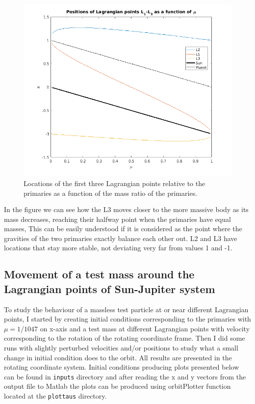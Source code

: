 \documentclass[12pt,a4paper,titlepage]{article}
\begin{document}
\begin{figure}
\centering
\includegraphics[width=\textwidth]{../plots/Lpoints.png}
\caption{Locations of the first three Lagrangian points relative to the primaries as a function of the mass ratio of the primaries.}
\label{Lpoints}
\end{figure} 

In the figure we can see how the L3 moves closer to the more massive body as its mass decreases, reaching their halfway point when the primaries have equal masses, This can be easily understood if it is considered as the point where the gravities of the two primaries exactly balance each other out. L2 and L3 have locations that stay more stable, not deviating very far from values 1 and -1.

\subsection{Movement of a test mass around the Lagrangian points of Sun-Jupiter system}\label{lagrangemovements}
To study the behaviour of a massless test particle at or near different Lagrangian points, I started by creating initial conditions corresponding to the primaries with $\mu=1/1047$ on x-axis and a test mass at different Lagrangian points with velocity corresponding to the rotation of the rotating coordinate frame. Then I did some runs with slightly perturbed velocities and/or positions to study what a small change in initial condition does to the orbit. All results are presented in the rotating coordinate system. Initial conditions producing plots presented below can be found in \texttt{inputs} directory and after reading the x and y vectors from the output file to Matlab the plots can be produced using orbitPlotter function located at the \texttt{plottaus} directory.
\end{document}

